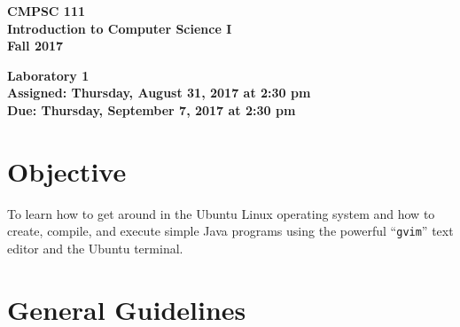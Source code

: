 \documentclass[11pt]{article}
\newcommand{\assignmentduedate}{September 7}
\newcommand{\assignmentassignedate}{August 31}
\newcommand{\labyear}{2017}
\newcommand{\labday}{Thursday}
\newcommand{\labtime}{2:30 pm}
\newcommand{\assigneddate}{Assigned: \labday, \assignmentassignedate, \labyear{} at \labtime{}}
\newcommand{\duedate}{Due: \labday, \assignmentduedate, \labyear{} at \labtime{}}
\newcommand{\labtitle}[1]
{
  \begin{center}
    \begin{center}
      \bf
      CMPSC 111\\Introduction to Computer Science I\\
      Fall 2017\\
      \medskip
    \end{center}
    \bf
    #1
  \end{center}
}
\begin{document}
\thispagestyle{empty}

\labtitle{Laboratory 1 \\ \assigneddate{} \\ \duedate{}}

\section*{Objective}

To learn how to get around in the Ubuntu Linux operating system and how to create, compile, and execute simple Java
programs using the powerful ``{\tt gvim}'' text editor and the Ubuntu terminal.

\section*{General Guidelines}
\end{document}
